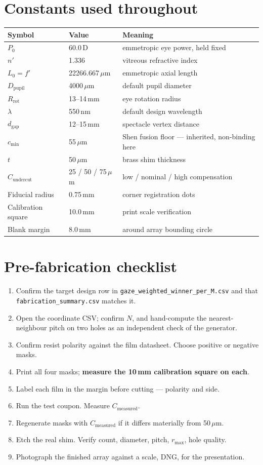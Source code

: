 \documentclass[11pt]{report}
\newcommand{\dgap}{d_{\text{gap}}}
\newcommand{\Dpupil}{D_{\text{pupil}}}
\begin{document}
\chapter{Constants used throughout}

\begin{longtable}{p{4.5cm}p{3.5cm}p{6.0cm}}
\toprule
\textbf{Symbol} & \textbf{Value} & \textbf{Meaning} \\
\midrule
\endhead
$P_0$ & 60.0\,D & emmetropic eye power, held fixed \\
$n'$ & 1.336 & vitreous refractive index \\
$L_0 = f'$ & 22266.667\,$\mu$m & emmetropic axial length \\
$\Dpupil$ & 4000\,$\mu$m & default pupil diameter \\
$R_{\text{rot}}$ & 13--14\,mm & eye rotation radius \\
$\lambda$ & 550\,nm & default design wavelength \\
$\dgap$ & 12--15\,mm & spectacle vertex distance \\
$c_{\min}$ & 55\,$\mu$m & Shen fusion floor --- inherited, non-binding here \\
$t$ & 50\,$\mu$m & brass shim thickness \\
$C_{\text{undercut}}$ & 25 / 50 / 75\,$\mu$m & low / nominal / high compensation \\
Fiducial radius & 0.75\,mm & corner registration dots \\
Calibration square & 10.0\,mm & print scale verification \\
Blank margin & 8.0\,mm & around array bounding circle \\
\bottomrule
\end{longtable}

\chapter{Pre-fabrication checklist}

\begin{enumerate}[leftmargin=1.2cm]
\item Confirm the target design row in \texttt{gaze\_weighted\_winner\_per\_M.csv} and that
\texttt{fabrication\_summary.csv} matches it.
\item Open the coordinate CSV; confirm $N$, and hand-compute the nearest-neighbour pitch on two
holes as an independent check of the generator.
\item Confirm resist polarity against the film datasheet. Choose positive or negative masks.
\item Print all four masks; \textbf{measure the 10\,mm calibration square on each}.
\item Label each film in the margin before cutting --- polarity and side.
\item Run the test coupon. Measure $C_{\text{measured}}$.
\item Regenerate masks with $C_{\text{measured}}$ if it differs materially from 50\,$\mu$m.
\item Etch the real shim. Verify count, diameter, pitch, $r_{\max}$, hole quality.
\item Photograph the finished array against a scale, DNG, for the presentation.
\end{enumerate}
\end{document}
